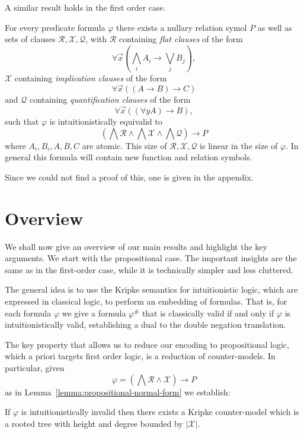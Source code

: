 \documentclass[runningheads]{llncs}
\begin{document}
A similar result holds in the first order case.

\begin{lemma}\label{lemma:first-order-normal-form}
	For every predicate formula $\varphi$ there exists a nullary relation symol $P$ as well as sets of clauses $\mathcal R,\mathcal X, \mathcal Q$, with $\mathcal R$ containing \emph{flat clauses} of the form
	$$\forall \vec x\left(\bigwedge_i A_i\to \bigvee_jB_j\right),$$
	$\mathcal X$ containing \emph{implication clauses} of the form
	$$\forall \vec x\left((A\to B)\to C\right)$$
	and $\mathcal Q$ containing \emph{quantification clauses} of the form
	$$\forall\vec x\left((\forall y A)\to B\right),$$
	such that $\varphi$ is intuitionistically equivalid to
	$$\left(\bigwedge\mathcal R\wedge\bigwedge \mathcal X\wedge\bigwedge\mathcal Q\right)\to P$$where $A_i, B_i, A, B, C$ are atomic. This size of $\mathcal R, \mathcal X, \mathcal Q$ is linear in the size of $\varphi$. In general this formula will contain new function and relation symbols.
\end{lemma}

Since we could not find a proof of this, one is given in the appendix.

\section{Overview}
\label{sec:overview}

We shall now give an overview of our main results and highlight the key arguments. We start with the propositional case. The important insights are the same as in the first-order case, while it is technically simpler and less cluttered.

The general idea is to use the Kripke semantics for intuitionistic logic, which are expressed in classical logic, to perform an embedding of formulas. That is, for each formula $\varphi$ we give a formula $\varphi^\#$ that is classically valid if and only if $\varphi$ is intuitionistically valid, establishing a dual to the double negation translation.

The key property that allows us to reduce our encoding to propositional logic, which a priori targets first order logic, is a reduction of counter-models. In particular, given $$\varphi = \left(\bigwedge\mathcal R\wedge\mathcal X\right)\to P$$ as in Lemma~\ref{lemma:propositional-normal-form} we establish:

\begin{lemma}
	If $\varphi$ is intuitionistically invalid then there exists a Kripke counter-model which is a rooted tree with height and degree bounded by $|\mathcal X|$.
\end{lemma}
\end{document}
